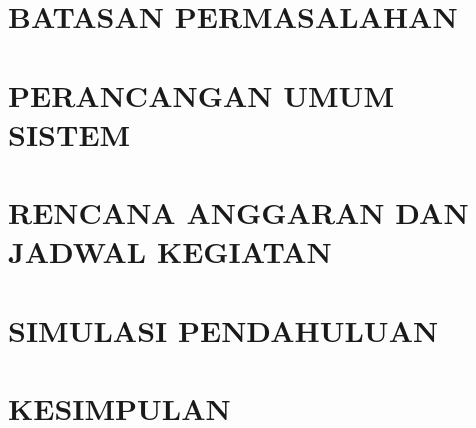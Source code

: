 \documentclass{DTETI_CP_C251}
\begin{document}
\chapter{\uppercase{Batasan Permasalahan}}
\label{chap:Batasan_Permasalahan}


\chapter{\uppercase{Perancangan Umum Sistem}}
\label{chap:Perancangan_Umum_Sistem}


\chapter{\uppercase{Rencana Anggaran dan Jadwal Kegiatan}}
\label{chap:RAB_JadwalKegiatan}


\chapter{\uppercase{Simulasi Pendahuluan}}
\label{chap:Simulasi_Pendahuluan}


\chapter{\uppercase{Kesimpulan}}
\label{chap:Kesimpulan}



\begin{thebibliography}{}

    

\end{thebibliography}

\end{document}
